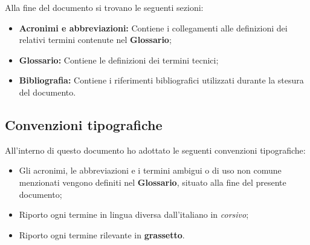 Alla fine del documento si trovano le seguenti sezioni:
\begin{itemize}
    \item \textbf{Acronimi e abbreviazioni:} Contiene i collegamenti alle definizioni dei relativi termini contenute nel \textbf{Glossario};
    \item \textbf{Glossario:} Contiene le definizioni dei termini tecnici;
    \item \textbf{Bibliografia:} Contiene i riferimenti bibliografici utilizzati durante la stesura del documento.
\end{itemize}


\subsection*{Convenzioni tipografiche}
All'interno di questo documento ho adottato le seguenti convenzioni tipografiche:

\begin{itemize}
    \item Gli acronimi, le abbreviazioni e i termini ambigui o di uso non comune menzionati vengono definiti nel \textbf{Glossario}, situato alla fine del presente documento;
    \item Riporto ogni termine in lingua diversa dall'italiano in \textit{corsivo};
    \item Riporto ogni termine rilevante in \textbf{grassetto}.
\end{itemize}




\normalsize
\normalsize

\endgroup

\vfill
